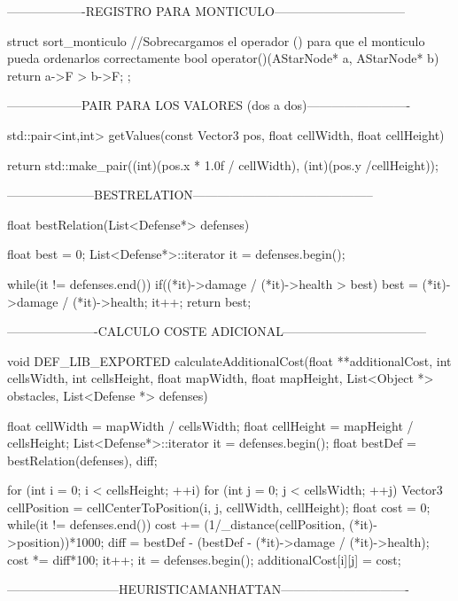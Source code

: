 -------------------REGISTRO PARA MONTICULO--------------------------------

struct sort_monticulo
{
    //Sobrecargamos el operador () para que el monticulo pueda ordenarlos correctamente  
    bool operator()(AStarNode* a, AStarNode* b)
    {
        return a->F > b->F;
    }
};

------------------PAIR PARA LOS VALORES (dos a dos)-------------------------

std::pair<int,int> getValues(const Vector3 pos, float cellWidth, float cellHeight)
{

    return std::make_pair((int)(pos.x * 1.0f / cellWidth), (int)(pos.y /cellHeight));

}

---------------------BESTRELATION--------------------------------------------

float bestRelation(List<Defense*> defenses)
{
    float best = 0;
    List<Defense*>::iterator it = defenses.begin();
    
    while(it != defenses.end())
    {
        if((*it)->damage / (*it)->health > best)
            best = (*it)->damage / (*it)->health;
        it++;
    }
    return best;
}

----------------------CALCULO COSTE ADICIONAL-----------------------------------

void DEF_LIB_EXPORTED calculateAdditionalCost(float **additionalCost, int cellsWidth, int cellsHeight, float mapWidth, float mapHeight, List<Object *> obstacles, List<Defense *> defenses){

    float cellWidth = mapWidth / cellsWidth;
    float cellHeight = mapHeight / cellsHeight;
    List<Defense*>::iterator it = defenses.begin();
    float bestDef = bestRelation(defenses), diff;

    for (int i = 0; i < cellsHeight; ++i)
    {
        for (int j = 0; j < cellsWidth; ++j)
        {
            Vector3 cellPosition = cellCenterToPosition(i, j, cellWidth, cellHeight);
            float cost = 0;
            while(it != defenses.end())
            {
                cost += (1/_distance(cellPosition, (*it)->position))*1000;
                diff = bestDef - (bestDef - (*it)->damage / (*it)->health);
                cost *= diff*100;
                it++;
            }
            it = defenses.begin();
            additionalCost[i][j] = cost;
        }
    }
}

---------------------------HEURISTICAMANHATTAN-------------------------------

